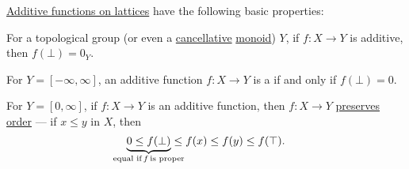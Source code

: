 \begin{proposition}\label{thm:def:boolean_algebra_additive_function}
  \hyperref[def:boolean_algebra_additive_function]{Additive functions on lattices} have the following basic properties:
  \begin{thmenum}
     For a topological group (or even a \hyperref[def:binary_operation/cancellative]{cancellative} \hyperref[def:monoid]{monoid}) \( Y \), if \( f: X \to Y \) is additive, then \( f(\bot) = 0_Y \).

     For \( Y = [-\infty, \infty] \), an additive function \( f: X \to Y \) is a \hyperref[def:effective_domain]{} if and only if \( f(\bot) = 0 \).

     For \( Y = [0, \infty] \), if \( f: X \to Y \) is an additive function, then \( f: X \to Y \) \hyperref[def:order_function/preserving]{preserves order} --- if \( x \leq y \) in \( X \), then
    \begin{equation}\label{eq:thm:def:boolean_algebra_additive_function/nonnegative_order}
      \underbrace{0 \leq f(\bot)}_{\mathclap{\T*{equal if} f \T*{is proper}}} \leq f(x) \leq f(y) \leq f(\top).
    \end{equation}
  \end{thmenum}
\end{proposition}
